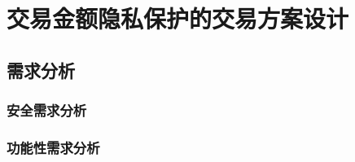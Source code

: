 \chapter{交易金额隐私保护的交易方案设计}



\section{需求分析}

\subsection{安全需求分析}


\subsection{功能性需求分析}



\section{}


